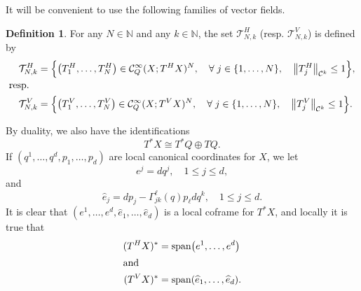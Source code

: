 \documentclass[10pt]{amsart}
\theoremstyle{definition}\newtheorem{defi}[theo]{Definition}\newtheorem{rema}[theo]{Remark}\newtheorem{exam}[theo]{Example}\newtheorem{exem}[theo]{Example}\newtheorem{nota}[theo]{Notation}
\newcommand{\N}{\mathbb{N}}
\newcommand{\clT}{\mathcal{T}}
\newcommand{\clC}{\mathcal{C}}
\DeclareMathOperator{\spann}{span}
\let\oldforall\forall
\renewcommand*{\forall}{\mathrel{\oldforall}}
\let\originalleft\left
\let\originalright\right
\renewcommand{\left}{\mathopen{}\mathclose\bgroup\originalleft}
\renewcommand{\right}{\aftergroup\egroup\originalright}
\begin{document}
It will be convenient to use the following families of vector fields.
\begin{defi}\label{de.famcalT}
For any $N\in \N$ and any $k\in \N$, the set $\clT_{N,k}^{H}$ (resp. $\clT_{N,k}^{V}$) is defined by
\begin{align*}
\clT_{N,k}^{H} &=\left\{\left(T_{1}^{H},\dots, T_{N}^{H}\right)\in \clC^{\infty}_{Q}(X;T^{H}X)^{N},\quad \forall j\in \left\{1,\dots, N\right\},\quad \left\|T_{j}^{H}\right\|_{\clC^{k}}\leq 1\right\},\\
\intertext{resp.}\quad\clT_{N,k}^{V}&=\left\{\left(T_{1}^{V},\dots, T_{N}^{V}\right)\in \clC^{\infty}_{Q}(X;T^{V}X)^{N},\quad \forall j\in \left\{1,\dots, N\right\},\quad \left\|T_{j}^{V}\right\|_{\clC^{k}}\leq 1\right\}.
\end{align*}
\end{defi}

By duality, we also have the identifications
\begin{equation}\label{identification_of_T*X}
T^* X \cong T^*Q \oplus T Q.
\end{equation}
If $(q^1, \dots, q^d, p_1, \dots, p_d)$ are local canonical coordinates for $X$, we let
\begin{equation}
e^j = dq^j, \quad 1 \le j \le d,
\end{equation}
and
\begin{equation}
\widehat{e}_j = dp_j - \Gamma^\ell_{jk}(q) p_\ell d q^k, \quad 1 \le j \le d.
\end{equation}
It is clear that $(e^1, \dots, e^d, \widehat{e}_1, \dots, \widehat{e}_d)$ is a local coframe for $T^* X$, and locally it is true that
\begin{align}
(T^H X)^* &= \spann \left(e^1, \dots, e^d\right)\\
\intertext{and}
(T^V X)^* &= \spann \left(\widehat{e}_1, \dots, \widehat{e}_d \right).
\end{align}
\end{document}
